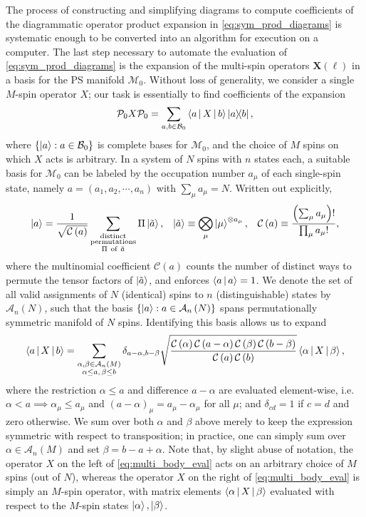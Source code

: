 \documentclass[nofootinbib,notitlepage,11pt]{revtex4-2}
\renewcommand{\t}{\text} %
\newcommand{\f}[2]{\dfrac{#1}{#2}} %
\newcommand{\p}[1]{\left(#1\right)} %
\renewcommand{\set}[1]{\left\{#1\right\}} %
\newcommand{\bk}{\Braket} %
\newcommand{\m}{\bm} %
\newcommand{\1}{\mathds{1}}
\newcommand{\A}{\mathcal{A}}
\newcommand{\B}{\mathcal{B}}
\newcommand{\C}{\mathcal{C}}
\newcommand{\M}{\mathcal{M}}
\renewcommand{\P}{\mathcal{P}}
\begin{document}
The process of constructing and simplifying diagrams to compute
coefficients of the diagrammatic operator product expansion in
\eqref{eq:sym_prod_diagrams} is systematic enough to be converted into
an algorithm for execution on a computer.  The last step necessary to
automate the evaluation of \eqref{eq:sym_prod_diagrams} is the
expansion of the multi-spin operators $\m X\p{\ell}$ in a basis for
the PS manifold $\M_0$.  Without loss of generality, we consider a
single $M$-spin operator $X$; our task is essentially to find
coefficients of the expansion
\begin{align}
  \P_0 X \P_0
  = \sum_{a,b\in\B_0} \bk{a|X|b} \op{a}{b},
\end{align}
where $\set{\ket{a}:a\in\B_0}$ is complete bases for $\M_0$, and the
choice of $M$ spins on which $X$ acts is arbitrary.  In a system of
$N$ spins with $n$ states each, a suitable basis for $\M_0$ can be
labeled by the occupation number $a_\mu$ of each single-spin state,
namely $a=\p{a_1,a_2,\cdots,a_n}$ with $\sum_\mu a_\mu=N$.  Written
out explicitly,
\begin{align}
  \ket{a} = \f1{\sqrt{\C\p{a}}}
  \sum_{\substack{\t{distinct}\\\t{permutations}\\\Pi~\t{of}~\tilde a}}
  \Pi \ket{\tilde a},
  &&
  \ket{\tilde a} \equiv \bigotimes_\mu \ket{\mu}^{\otimes a_\mu},
  &&
  \C\p{a} \equiv \f{\p{\sum_\mu a_\mu}!}{\prod_\mu a_\mu!},
\end{align}
where the multinomial coefficient $\C\p{a}$ counts the number of
distinct ways to permute the tensor factors of $\ket{\tilde a}$, and
enforces $\bk{a|a}=1$.  We denote the set of all valid assignments of
$N$ (identical) spins to $n$ (distinguishable) states by $\A_n\p{N}$,
such that the basis $\set{\ket{a}:a\in\A_n\p{N}}$ spans
permutationally symmetric manifold of $N$ spins.  Identifying this
basis allows us to expand
\begin{align}
  \bk{a|X|b}
  = \sum_{\substack{\alpha,\beta\in\A_n\p{M}\\\alpha\le a,\,\beta\le b}}
  \delta_{a-\alpha,b-\beta}
  \sqrt{\f{\C\p{\alpha}\C\p{a-\alpha}\C\p{\beta}\C\p{b-\beta}}
    {\C\p{a}\C\p{b}}}
  \bk{\alpha|X|\beta},
  \label{eq:multi_body_eval}
\end{align}
where the restriction $\alpha\le a$ and difference $a-\alpha$ are
evaluated element-wise, i.e.~$\alpha<a\implies \alpha_\mu\le a_\mu$
and $\p{a-\alpha}_\mu=a_\mu-\alpha_\mu$ for all $\mu$; and
$\delta_{cd}=1$ if $c=d$ and zero otherwise.  We sum over both
$\alpha$ and $\beta$ above merely to keep the expression symmetric
with respect to transposition; in practice, one can simply sum over
$\alpha\in\A_n\p{M}$ and set $\beta=b-a+\alpha$.  Note that, by slight
abuse of notation, the operator $X$ on the left of
\eqref{eq:multi_body_eval} acts on an arbitrary choice of $M$ spins
(out of $N$), whereas the operator $X$ on the right of
\eqref{eq:multi_body_eval} is simply an $M$-spin operator, with matrix
elements $\bk{\alpha|X|\beta}$ evaluated with respect to the $M$-spin
states $\ket\alpha,\ket\beta$.
\end{document}
